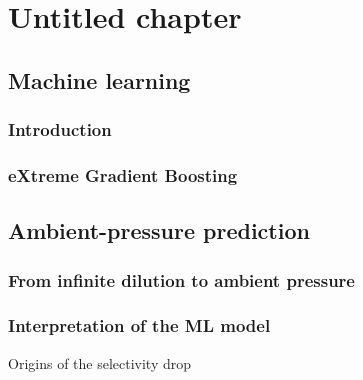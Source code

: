 \documentclass[thesis]{subfiles}
\begin{document}
\chapter{Untitled chapter}
\vspace*{-1\baselineskip}
\section{Machine learning}

\subsection{Introduction}

\subsection{eXtreme Gradient Boosting}

\section{Ambient-pressure prediction}

\subsection{From infinite dilution to ambient pressure}

\subsection{Interpretation of the ML model}

Origins of the selectivity drop

\OnlyInSubfile{\printglobalbibliography}
\end{document}
